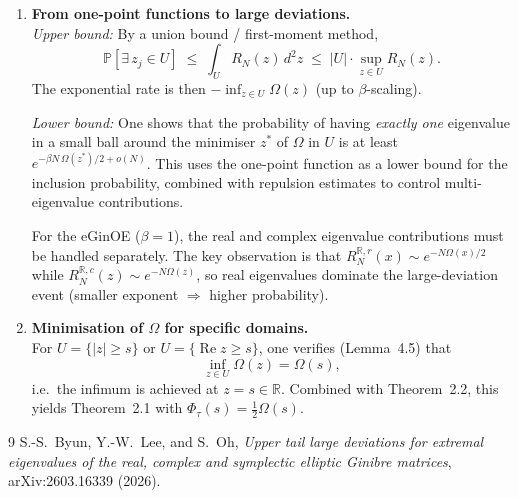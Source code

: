 \documentclass[11pt,a4paper]{article}
\theoremstyle{definition}
\theoremstyle{remark}
\begin{document}
\begin{enumerate}[label=\textbf{Step \arabic*.},leftmargin=2.5em]
\item \textbf{From one-point functions to large deviations.}\\
\textit{Upper bound:} By a union bound / first-moment method,
\[
\mathbb{P}[\exists\, z_j\in U]\;\le\;\int_U R_N(z)\,d^2z\;\le\; |U|\cdot\sup_{z\in U}R_N(z).
\]
The exponential rate is then $-\inf_{z\in U}\Omega(z)$ (up to $\beta$-scaling).

\textit{Lower bound:} One shows that the probability of having \emph{exactly one} eigenvalue in a small ball around the minimiser $z^*$ of $\Omega$ in $U$ is at least $e^{-\beta N\,\Omega(z^*)/2+o(N)}$.  This uses the one-point function as a lower bound for the inclusion probability, combined with repulsion estimates to control multi-eigenvalue contributions.

For the eGinOE ($\beta=1$), the real and complex eigenvalue contributions must be handled separately.  The key observation is that $R_N^{\mathbb{R},r}(x)\sim e^{-N\Omega(x)/2}$ while $R_N^{\mathbb{R},c}(z)\sim e^{-N\Omega(z)}$, so real eigenvalues dominate the large-deviation event (smaller exponent $\Rightarrow$ higher probability).

\item \textbf{Minimisation of $\Omega$ for specific domains.}\\
For $U=\{|z|\ge s\}$ or $U=\{\operatorname{Re} z\ge s\}$, one verifies (Lemma~4.5) that
\[
\inf_{z\in U}\Omega(z)=\Omega(s),
\]
i.e.\ the infimum is achieved at $z=s\in\mathbb{R}$.  Combined with Theorem~2.2, this yields Theorem~2.1 with $\Phi_\tau(s)=\tfrac{1}{2}\Omega(s)$.
\end{enumerate}

\begin{thebibliography}{9}
S.-S.\ Byun, Y.-W.\ Lee, and S.\ Oh,
\emph{Upper tail large deviations for extremal eigenvalues of the real, complex and symplectic elliptic Ginibre matrices},
arXiv:2603.16339 (2026).
\end{thebibliography}
\end{document}
